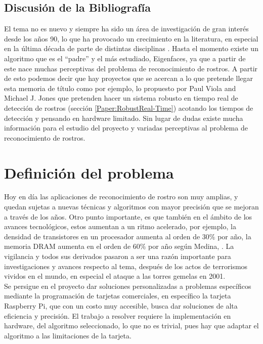 \documentclass[letterpaper,12pt]{article}
\begin{document}
\subsection{Discusión de la Bibliografía}
El tema no es nuevo y siempre ha sido un área de investigación de gran interés desde los años 90, lo que ha provocado un crecimiento en la literatura, en especial en la última década de parte de distintas disciplinas \cite{Bovik}. Hasta el momento existe un algoritmo que es el ``padre'' y el más estudiado, Eigenfaces, ya que a partir de este nace muchas perceptivas del problema de reconocimiento de rostros. A partir de esto podemos decir que hay proyectos que se acercan a lo que pretende llegar esta memoria de título como por ejemplo, lo propuesto por Paul Viola and Michael J. Jones que pretenden hacer un sistema robusto en tiempo real de detección de rostros (sección \ref{Paper:RobustReal-Time}) acotando los tiempos de detección y pensando en hardware limitado. Sin lugar de dudas existe mucha información para el estudio del proyecto y variadas perceptivas al problema de reconocimiento de rostros.

\newpage
\section{Definición del problema}

Hoy en día las aplicaciones de reconocimiento de rostro son muy amplias, y quedan sujetas a nuevas técnicas y algoritmos con mayor precisión que se mejoran a través de los años. Otro punto importante, es que también en el ámbito de los avances tecnológicos, estos aumentan a un ritmo acelerado, por ejemplo, la densidad de transistores en un procesador aumenta al orden de $30\%$ por año, la memoria DRAM aumenta en el orden de $60\%$ por año según Medina, \cite{Medina}. La vigilancia y todos sus derivados pasaron a ser una razón importante para investigaciones y avances respecto al tema, después de los actos de terrorismos vividos en el mundo, en especial el ataque a las torres gemelas en 2001.\\Se persigue en el proyecto dar soluciones personalizadas a problemas específicos mediante la programación de tarjetas comerciales, en específico la tarjeta Raspberry Pi, que con un costo muy accesible, busca dar soluciones de alta eficiencia y precisión. El trabajo a resolver requiere la implementación en hardware, del algoritmo seleccionado, lo que no es trivial, pues hay que adaptar el algoritmo a las limitaciones de la tarjeta.
\end{document}
